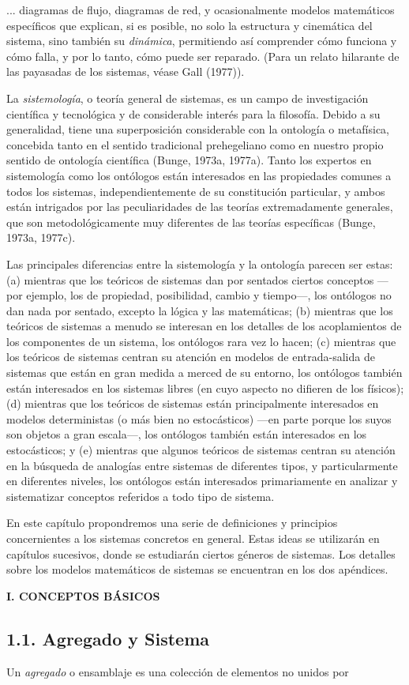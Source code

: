 {\fontsize{13}{15}\selectfont
... diagramas de flujo, diagramas de red, y ocasionalmente modelos matemáticos específicos que explican, si es posible, no solo la estructura y cinemática del sistema, sino también su \textit{dinámica}, permitiendo así comprender cómo funciona y cómo falla, y por lo tanto, cómo puede ser reparado. (Para un relato hilarante de las payasadas de los sistemas, véase Gall (1977)).

La \textit{sistemología}, o teoría general de sistemas, es un campo de investigación científica y tecnológica y de considerable interés para la filosofía. Debido a su generalidad, tiene una superposición considerable con la ontología o metafísica, concebida tanto en el sentido tradicional prehegeliano como en nuestro propio sentido de ontología científica (Bunge, 1973a, 1977a). Tanto los expertos en sistemología como los ontólogos están interesados en las propiedades comunes a todos los sistemas, independientemente de su constitución particular, y ambos están intrigados por las peculiaridades de las teorías extremadamente generales, que son metodológicamente muy diferentes de las teorías específicas (Bunge, 1973a, 1977c).

Las principales diferencias entre la sistemología y la ontología parecen ser estas: (a) mientras que los teóricos de sistemas dan por sentados ciertos conceptos —por ejemplo, los de propiedad, posibilidad, cambio y tiempo—, los ontólogos no dan nada por sentado, excepto la lógica y las matemáticas; (b) mientras que los teóricos de sistemas a menudo se interesan en los detalles de los acoplamientos de los componentes de un sistema, los ontólogos rara vez lo hacen; (c) mientras que los teóricos de sistemas centran su atención en modelos de entrada-salida de sistemas que están en gran medida a merced de su entorno, los ontólogos también están interesados en los sistemas libres (en cuyo aspecto no difieren de los físicos); (d) mientras que los teóricos de sistemas están principalmente interesados en modelos deterministas (o más bien no estocásticos) —en parte porque los suyos son objetos a gran escala—, los ontólogos también están interesados en los estocásticos; y (e) mientras que algunos teóricos de sistemas centran su atención en la búsqueda de analogías entre sistemas de diferentes tipos, y particularmente en diferentes niveles, los ontólogos están interesados primariamente en analizar y sistematizar conceptos referidos a todo tipo de sistema.

En este capítulo propondremos una serie de definiciones y principios concernientes a los sistemas concretos en general. Estas ideas se utilizarán en capítulos sucesivos, donde se estudiarán ciertos géneros de sistemas. Los detalles sobre los modelos matemáticos de sistemas se encuentran en los dos apéndices.

\begin{center}
{\large \textbf{I. CONCEPTOS BÁSICOS}}
\end{center}

\subsection*{\textbf{1.1. Agregado y Sistema}} 
Un \textit{agregado} o ensamblaje es una colección de elementos no unidos por}

